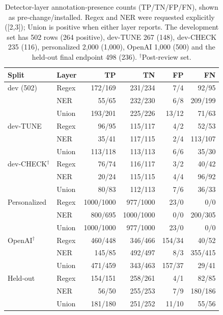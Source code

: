 \documentclass[sigconf]{acmart}
\theoremstyle{acmdefinition}\newtheorem{property}{Property}
\begin{document}
\begin{table}[!t]
\centering
\caption{Detector-layer annotation-presence counts (TP/TN/FP/FN), shown as pre-change/installed. Regex and NER were requested explicitly ([2,3]); Union is positive when either layer reports. The development set has 502 rows (264 positive), dev-TUNE 267 (148), dev-CHECK 235 (116), personalized 2,000 (1,000), OpenAI 1,000 (500) and the held-out final endpoint 498 (236). $^\dagger$Post-review set.}
\label{tab:detprec}
\small
\setlength{\tabcolsep}{3pt}
\begin{tabular}{llrrrr}
\toprule
Split & Layer & TP & TN & FP & FN \\
\midrule
dev (502) & Regex & 172/169 & 231/234 & 7/4 & 92/95 \\
 & NER & 55/65 & 232/230 & 6/8 & 209/199 \\
 & Union & 193/201 & 225/226 & 13/12 & 71/63 \\
\midrule
dev-TUNE & Regex & 96/95 & 115/117 & 4/2 & 52/53 \\
 & NER & 35/41 & 117/115 & 2/4 & 113/107 \\
 & Union & 113/118 & 113/113 & 6/6 & 35/30 \\
\midrule
dev-CHECK$^\dagger$ & Regex & 76/74 & 116/117 & 3/2 & 40/42 \\
 & NER & 20/24 & 115/115 & 4/4 & 96/92 \\
 & Union & 80/83 & 112/113 & 7/6 & 36/33 \\
\midrule
Personalized & Regex & 1000/1000 & 977/1000 & 23/0 & 0/0 \\
 & NER & 800/695 & 1000/1000 & 0/0 & 200/305 \\
 & Union & 1000/1000 & 977/1000 & 23/0 & 0/0 \\
\midrule
OpenAI$^\dagger$ & Regex & 460/448 & 346/466 & 154/34 & 40/52 \\
 & NER & 145/85 & 492/497 & 8/3 & 355/415 \\
 & Union & 471/459 & 343/463 & 157/37 & 29/41 \\
\midrule
Held-out & Regex & 154/151 & 258/261 & 4/1 & 82/85 \\
 & NER & 56/50 & 255/253 & 7/9 & 180/186 \\
 & Union & 181/180 & 251/252 & 11/10 & 55/56 \\
\bottomrule
\end{tabular}
\end{table}
\end{document}
